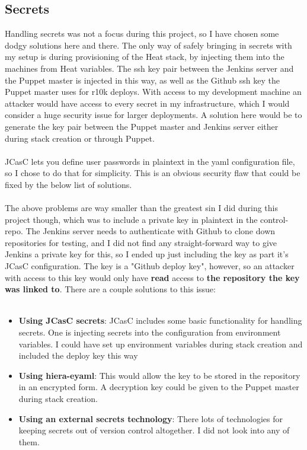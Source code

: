 \subsection{Secrets}

Handling secrets was not a focus during this project, so I have chosen some dodgy solutions here and there. The only way of safely bringing in secrets with my setup is during provisioning of the Heat stack, by injecting them into the machines from Heat variables. The ssh key pair between the Jenkins server and the Puppet master is injected in this way, as well as the Github ssh key the Puppet master uses for r10k deploys. With access to my development machine an attacker would have access to every secret in my infrastructure, which I would consider a huge security issue for larger deployments. A solution here would be to generate the key pair between the Puppet master and Jenkins server either during stack creation or through Puppet.
\\
\\
JCasC lets you define user passwords in plaintext in the yaml configuration file, so I chose to do that for simplicity. This is an obvious security flaw that could be fixed by the below list of solutions.
\\
\\
The above problems are way smaller than the greatest sin I did during this project though, which was to include a private key in plaintext in the control-repo. The Jenkins server needs to authenticate with Github to clone down repositories for testing, and I did not find any straight-forward way to give Jenkins a private key for this, so I ended up just including the key as part it's JCasC configuration. The key is a "Github deploy key"\cite{githubdeploykeyarticle}, however, so an attacker with access to this key would only have \textbf{read} access to \textbf{the repository the key was linked to}. There are a couple solutions to this issue:
\\
\\
\begin{itemize}  
\item \textbf{Using JCasC secrets}: JCasC includes some basic functionality for handling secrets\cite{jcascgithub}. One is injecting secrets into the configuration from environment variables. I could have set up environment variables during stack creation and included the deploy key this way
\item \textbf{Using hiera-eyaml}: This would allow the key to be stored in the repository in an encrypted form. A decryption key could be given to the Puppet master during stack creation.
\item \textbf{Using an external secrets technology}: There lots of technologies for keeping secrets out of version control altogether. I did not look into any of them.
\end{itemize}

